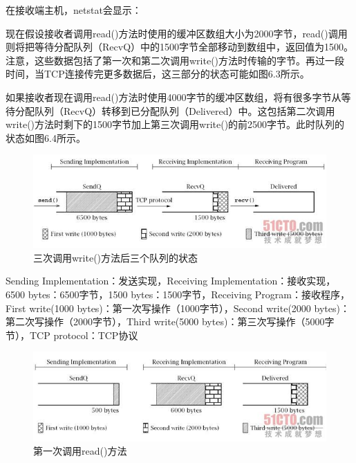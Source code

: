 	

	在接收端主机，netstat会显示：

	

	现在假设接收者调用read()方法时使用的缓冲区数组大小为2000字节，read()调用则将把等待分配队列（RecvQ）中的1500字节全部移动到数组中，返回值为1500。注意，这些数据包括了第一次和第二次调用write()方法时传输的字节。再过一段时间，当TCP连接传完更多数据后，这三部分的状态可能如图6.3所示。

	如果接收者现在调用read()方法时使用4000字节的缓冲区数组，将有很多字节从等待分配队列（RecvQ）转移到已分配队列（Delivered）中。这包括第二次调用write()方法时剩下的1500字节加上第三次调用write()的前2500字节。此时队列的状态如图6.4所示。

	\begin{figure}[htbp]%
		\centering
		\includegraphics[scale=.6]{img/06.02.jpg}
		\caption{三次调用write()方法后三个队列的状态}
		\label{fig:tree.time.call.write.get.tree.query}
	\end{figure}

	Sending Implementation：发送实现，Receiving Implementation：接收实现，6500 bytes：6500字节，1500 bytes：1500字节，Receiving Program：接收程序，First write(1000 bytes)：第一次写操作（1000字节），Second write(2000 bytes)：第二次写操作（2000字节），Third write(5000 bytes)：第三次写操作（5000字节），TCP protocol：TCP协议

	\begin{figure}[htbp]%
		\centering
		\includegraphics[scale=.6]{img/06.03.jpg}
		\caption{第一次调用read()方法}
		\label{fig:first.time.call.read.func}
	\end{figure}

